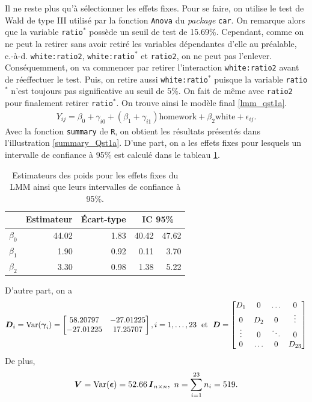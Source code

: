 \documentclass{article}
\begin{document}
		Il ne reste plus qu'à sélectionner les effets fixes. Pour se faire, on utilise le test de Wald de type III utilisé par la fonction \texttt{Anova} du \textit{package} \texttt{car}.
		On remarque alors que la variable \texttt{ratio}$^*$ possède un seuil de test de 15.69\%. Cependant, comme on ne peut la retirer sans avoir retiré les variables dépendantes d'elle au préalable, c.-à-d. \texttt{white:ratio2}, \texttt{white:ratio}$^*$ et \texttt{ratio2}, on ne peut pas l'enlever. Conséquemment, on va commencer par retirer l'interaction \texttt{white:ratio2} avant de réeffectuer le test. Puis, on retire aussi \texttt{white:ratio}$^*$ puisque la variable \texttt{ratio}$^*$ n'est toujours pas significative au seuil de 5\%. On fait de même avec \texttt{ratio2} pour finalement retirer \texttt{ratio}$^*$. On trouve ainsi le modèle final \eqref{lmm_qst1a}.
		\begin{align}\label{lmm_qst1a}
			Y_{ij} = \beta_0+\gamma_{i0} + (\beta_1 + \gamma_{i1}) \mathrm{homework} + \beta_2 \mathrm{white} + \epsilon_{ij}.
		\end{align}
		Avec la fonction \texttt{summary} de \texttt{R}, on obtient les résultats présentés dans l'illustration \ref{summary_Qst1a}. D'une part, on a les effets fixes pour lesquels un intervalle de confiance à 95\% est calculé dans le tableau \ref{tbl_effets_fixes_qst1a}.
		\begin{table}[H]
			\centering
			\begin{tabular}{lrrrr}
				\hline
				& Estimateur & Écart-type & \multicolumn{2}{c}{IC 95\%} \\ 
				\hline
				$\beta_0$ & 44.02 & 1.83 & 40.42 & 47.62 \\ 
				$\beta_1$ & 1.90 & 0.92 & 0.11 & 3.70 \\ 
				$\beta_2$ & 3.30 & 0.98 & 1.38 & 5.22 \\ 
				\hline
			\end{tabular}
		\caption{Estimateurs des poids pour les effets fixes du LMM ainsi que leurs intervalles de confiance à 95\%.}
		\label{tbl_effets_fixes_qst1a}
		\end{table}
		D'autre part, on a 
		\begin{align}
			\boldsymbol{D}_i = \mathrm{Var}(\boldsymbol{\gamma}_i) = 
			\begin{bmatrix}
				58.20797 & -27.01225 \\
				-27.01225& 17.25707  \\
			\end{bmatrix},
			i=1,\dots,23
			\; \text{ et }\;
			\boldsymbol{D} = 
			\begin{bmatrix}
				D_1 & 0 & \dots & 0 \\
				0 & D_2 & 0 & \vdots \\
				\vdots & 0 & \ddots & 0 \\
				0 & \dots & 0 & D_{23}
			\end{bmatrix}
		\end{align}
		De plus,
		\begin{align}
			\boldsymbol{V} = \mathrm{Var}(\boldsymbol{\epsilon}) = 
			52.66\, \boldsymbol{I}_{n\times n},
			\ n=\sum_{i=1}^{23} n_i = 519.
		\end{align}
	
\end{document}
